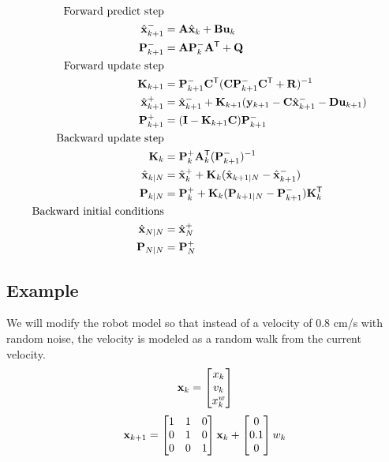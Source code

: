 \begin{theorem}
  \label{thm:kalman_smoother}
  \begin{align}
    \text{Forward predict step} \nonumber \\
    \hat{\mathbf{x}}_{k+1}^- &= \mathbf{A}\hat{\mathbf{x}}_k + \mathbf{B} \mathbf{u}_k \\
    \mathbf{P}_{k+1}^- &= \mathbf{A} \mathbf{P}_k^- \mathbf{A}^\mathsf{T} + \mathbf{Q} \\
    \text{Forward update step} \nonumber \\
    \mathbf{K}_{k+1} &=
      \mathbf{P}_{k+1}^- \mathbf{C}^\mathsf{T} (\mathbf{C}\mathbf{P}_{k+1}^- \mathbf{C}^\mathsf{T} +
      \mathbf{R})^{-1} \\
    \hat{\mathbf{x}}_{k+1}^+ &=
      \hat{\mathbf{x}}_{k+1}^- + \mathbf{K}_{k+1}(\mathbf{y}_{k+1} -
      \mathbf{C} \hat{\mathbf{x}}_{k+1}^- - \mathbf{D}\mathbf{u}_{k+1}) \\
    \mathbf{P}_{k+1}^+ &= (\mathbf{I} - \mathbf{K}_{k+1}\mathbf{C})\mathbf{P}_{k+1}^- \\
    \text{Backward update step} \nonumber \\
    \mathbf{K}_k &= \mathbf{P}_k^+ \mathbf{A}_k^\mathsf{T} (\mathbf{P}_{k+1}^-)^{-1} \\
    \hat{\mathbf{x}}_{k|N} &= \hat{\mathbf{x}}_k^+ +
      \mathbf{K}_k(\hat{\mathbf{x}}_{k+1|N} - \hat{\mathbf{x}}_{k+1}^-) \\
    \mathbf{P}_{k|N} &=
      \mathbf{P}_k^+ + \mathbf{K}_k(\mathbf{P}_{k+1|N} - \mathbf{P}_{k+1}^-)\mathbf{K}_k^\mathsf{T} \\
    \text{Backward initial conditions} \nonumber \\
    \hat{\mathbf{x}}_{N|N} &= \hat{\mathbf{x}}_N^+ \\
    \mathbf{P}_{N|N} &= \mathbf{P}_N^+
  \end{align}
\end{theorem}

\subsection{Example}

We will modify the robot model so that instead of a velocity of $0.8$ cm/s with
random noise, the velocity is modeled as a random walk from the current
velocity.
\begin{equation}
  \mathbf{x}_k =
  \begin{bmatrix}
    x_k \\
    v_k \\
    x_k^w
  \end{bmatrix}
\end{equation}
\begin{equation}
  \mathbf{x}_{k+1} =
  \begin{bmatrix}
    1 & 1 & 0 \\
    0 & 1 & 0 \\
    0 & 0 & 1
  \end{bmatrix} \mathbf{x}_k +
  \begin{bmatrix}
    0 \\
    0.1 \\
    0
  \end{bmatrix} w_k
\end{equation}

